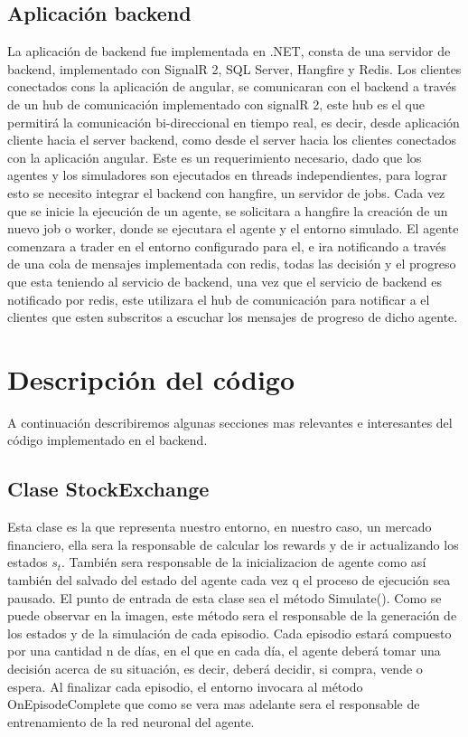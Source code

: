 \subsection{Aplicación backend}

La aplicación de backend fue implementada en .NET, consta de una servidor de backend, implementado con SignalR 2, SQL Server, Hangfire y Redis. 
Los clientes conectados cons la aplicación de angular, se comunicaran con el backend a través de un hub de comunicación implementado con signalR 2, este hub es el que permitirá la comunicación bi-direccional en tiempo real, es decir, desde aplicación cliente hacia el server backend, como desde el server hacia los clientes conectados con la aplicación angular. Este es un requerimiento necesario, dado que los agentes y los simuladores son ejecutados en threads independientes, para lograr esto se necesito integrar el backend con hangfire, un servidor de jobs. 
Cada vez que se inicie la ejecución de un agente, se solicitara a hangfire la creación de un nuevo job o worker, donde se ejecutara el agente y el entorno simulado. El agente comenzara a trader en el entorno configurado para el, e ira notificando a través de una cola de mensajes implementada con redis, todas las decisión y el progreso que esta teniendo al servicio de backend, una vez que el servicio de backend es notificado por redis, este utilizara el hub de comunicación para notificar a el clientes que esten subscritos a escuchar los mensajes de progreso de dicho agente.

\section{Descripción del código}
A continuación describiremos algunas secciones mas relevantes e interesantes del código implementado en el backend.

\subsection{Clase StockExchange}

Esta clase es la que representa nuestro entorno, en nuestro caso, un mercado financiero, ella sera la responsable de calcular los rewards y de ir actualizando los estados $s_t$. También sera responsable de la inicializacion de agente como así también del salvado del estado del agente cada vez q el proceso de ejecución sea pausado. El punto de entrada de esta clase sea el método Simulate().
Como se puede observar en la imagen, este método sera el responsable de la generación de los estados y de la simulación de cada episodio. Cada episodio estará compuesto por una cantidad n de días, en el que en cada día, el agente
deberá tomar una decisión acerca de su situación, es decir, deberá decidir, si compra, vende o espera. Al finalizar cada episodio, el entorno invocara al método OnEpisodeComplete que como se vera mas adelante sera el responsable de entrenamiento de la red neuronal del agente.\\

